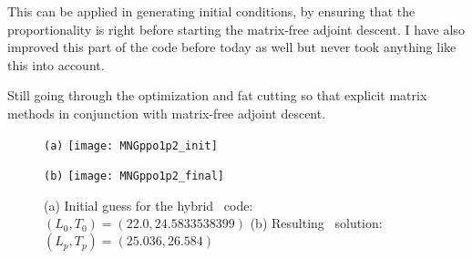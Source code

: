 \begin{description}
{\begin{description}
This can be applied in generating initial conditions, by ensuring that
the proportionality is right before starting the matrix-free adjoint
descent. I have also improved this part of the code before today as well
but never took anything like this into account.

\item[Direct Matrix Code]
Still going through the optimization and fat cutting so that explicit matrix
methods in conjunction with matrix-free adjoint descent.
\end{description}
}


\begin{figure}
\begin{minipage}[height=.32\textheight]{.5\textwidth}
\centering \small{\texttt{(a)}}
\texttt{[image: MNGppo1p2\_init]}
\end{minipage}
\begin{minipage}[height=.32\textheight]{.5\textwidth}
\centering \small{\texttt{(b)}}
\texttt{[image: MNGppo1p2\_final]}
\end{minipage}
\caption{ \label{fig:MNGppo1p2}
(a) Initial guess for the hybrid \twot\ code:
$(L_0,T_0) = (22.0,24.5833538399)$
(b) Resulting \twot\ solution: $(L_p,T_p) = (25.036,26.584)$
}
\end{figure}




\end{description}
